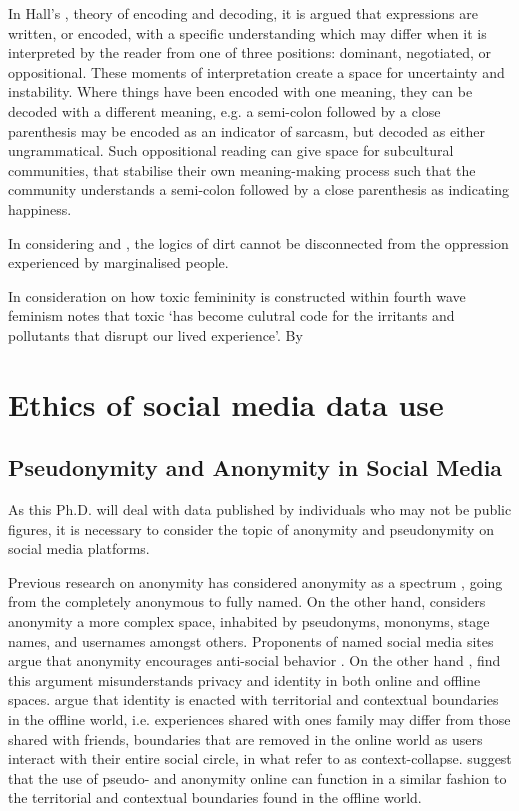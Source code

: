 {In Hall's \citeyear{Hall:1997}, theory of encoding and decoding, it is argued that expressions are written, or encoded, with a specific understanding which may differ when it is interpreted by the reader from one of three positions: dominant, negotiated, or oppositional. These moments of interpretation create a space for uncertainty and instability. Where things have been encoded with one meaning, they can be decoded with a different meaning, e.g. a semi-colon followed by a close parenthesis may be encoded as an indicator of sarcasm, but decoded as either ungrammatical. Such oppositional reading can give space for subcultural communities, that stabilise their own meaning-making process such that the community understands a semi-colon followed by a close parenthesis as indicating happiness.

In considering \cite{Hall:1997} and \cite{Lepawsky:2019}, the logics of dirt cannot be disconnected from the oppression experienced by marginalised people.

\cite{Roberts:2019}

In consideration on how toxic femininity is constructed within fourth wave feminism \citet{Rissam:2015} notes that toxic `has become culutral code for the irritants and pollutants that disrupt our lived experience'. By

\section{Ethics of social media data use}

} %
\subsection{Pseudonymity and Anonymity in Social Media}\label{sec:pseudonymity}

As this Ph.D. will deal with data published by individuals who may not be public figures, it is necessary to consider the topic of anonymity and pseudonymity on social media platforms.

Previous research on anonymity has considered anonymity as a spectrum \citep{Qian:2007,Donath:1999}, going from the completely anonymous to fully named. On the other hand, \cite{Nagel:2015} considers anonymity a more complex space, inhabited by pseudonyms, mononyms, stage names, and usernames amongst others. Proponents of named social media sites argue that anonymity encourages anti-social behavior \citep{Galperin:2011}. On the other hand \cite{Nagel:2015}, find this argument misunderstands privacy and identity in both online and offline spaces. \cite{Nagel:2015} argue that identity is enacted with territorial and contextual boundaries in the offline world, i.e. experiences shared with ones family may differ from those shared with friends, boundaries that are removed in the online world as users interact with their entire social circle, in what \cite{Marwick:2011} refer to as context-collapse. \cite{Nagel:2015} suggest that the use of pseudo- and anonymity online can function in a similar fashion to the territorial and contextual boundaries found in the offline world.

